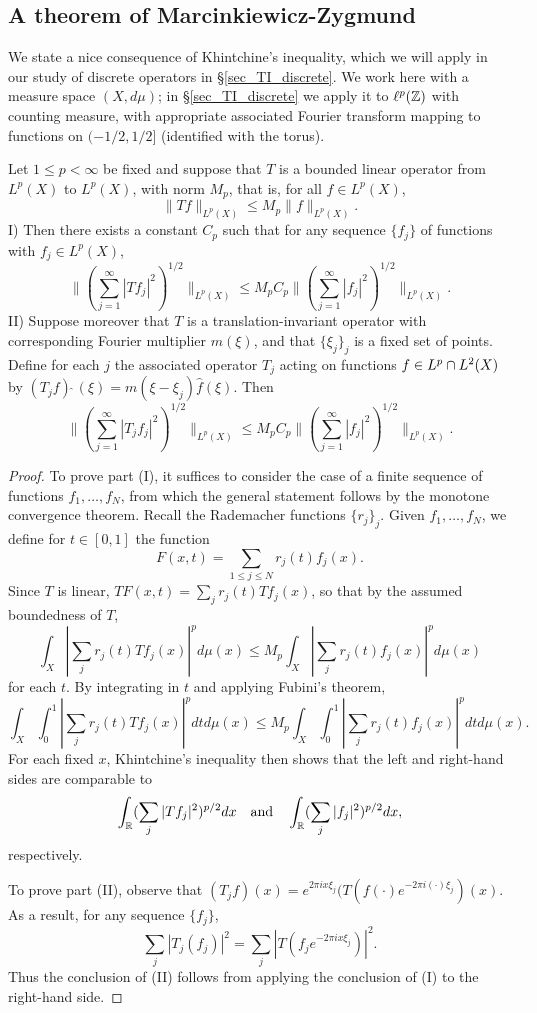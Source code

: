 \documentclass[oneside,11pt]{amsart}
\begin{document}
\subsection{A theorem of Marcinkiewicz-Zygmund}
We state a nice consequence of Khintchine's inequality, which we will apply in our study of discrete operators in \S \ref{sec_TI_discrete}.
We work here with a measure space $(X,d\mu)$; in \S \ref{sec_TI_discrete} we apply it to $\ell^p(\mathbb{Z})$ with counting measure,  with appropriate associated Fourier transform mapping to functions on $(-1/2,1/2]$ (identified with the torus).
\begin{thm}\label{thm_MarZyg_p}
Let $1\leq p < \infty$ be fixed and suppose that $T$ is a bounded linear operator from $L^p(X)$ to $L^p(X)$, with norm $M_p$, that is, for all $f \in L^p(X)$,
\[ \|Tf\|_{L^p(X)} \leq M_p \|f\|_{L^p(X)}.\]
I) Then there exists a constant $C_p$ such that for any sequence $\{ f_j\}$ of functions with $f_j \in L^p(X)$,
\[ 
\| ( \sum_{j=1}^\infty |Tf_j|^2)^{1/2} \|_{L^p(X)} \leq M_p C_p \| ( \sum_{j=1}^\infty |f_j|^2)^{1/2} \|_{L^p(X)} .\]
II) Suppose moreover that $T$ is a translation-invariant operator with corresponding Fourier multiplier $m(\xi)$, and that $\{\xi_j\}_j$ is a fixed set of points. Define for each $j$ the associated operator $T_j$ acting on functions $f \in L^p \cap L^2(X)$ by $(T_j f)\widehat{\;} (\xi) = m(\xi - \xi_j) \widehat{f}(\xi)$. 
Then 
\[ 
\| ( \sum_{j=1}^\infty |T_jf_j|^2)^{1/2} \|_{L^p(X)} \leq M_p C_p\| ( \sum_{j=1}^\infty |f_j|^2)^{1/2} \|_{L^p(X)} .\]
\end{thm}


 
 \begin{proof}
To prove part (I), it suffices to consider the case of a finite sequence of functions $f_1,\ldots, f_N$, from which the general statement   follows by the monotone convergence theorem. Recall the Rademacher functions $\{r_j\}_j$. Given $f_1,\ldots, f_N$, we define for $t \in [0,1]$ the function
 \[F(x,t) = \sum_{1 \leq j \leq N} r_j(t)f_j(x). \]
Since $T$ is linear, $TF(x,t) = \sum_j r_j(t) Tf_j(x)$, so that by the assumed boundedness of $T$, 
\[ \int_X | \sum_j r_j(t) Tf_j(x) |^p d\mu(x) \leq M_p \int_X | \sum_j r_j(t) f_j(x)|^p d\mu(x)\]
for each $t$.
By integrating in $t$ and applying Fubini's theorem,  
\[ \int_X \int_0^1 |\sum_j r_j(t) Tf_j(x)|^p dt d\mu(x) \leq M_p \int_X \int_0^1 | \sum_j r_j(t) f_j(x) |^p dt d\mu(x).\]
For each fixed $x$,   Khintchine's inequality then shows that the left and right-hand sides are comparable to 
\[ 
	\int_{\mathbb{R}} ( \sum_j |Tf_j|^2)^{p/2} dx  \quad \text{and} \quad 
\int_{\mathbb{R}} ( \sum_j |f_j|^2)^{p/2} dx ,
\]
respectively.
 
 
To prove part (II), observe that  
$(T_jf)(x) = e^{2\pi i x \xi_j} (T(f(\cdot) e^{-2\pi i ( \cdot )\xi_j})(x).$
 As a result, for any sequence $\{f_j\}$,
\[ \sum_j |T_j(f_j)|^2 = \sum_j |T (f_j e^{-2\pi i x \xi_j})|^2.
\]
Thus the conclusion of (II) follows from applying the conclusion of (I) to the right-hand side.
\end{proof}
\end{document}
